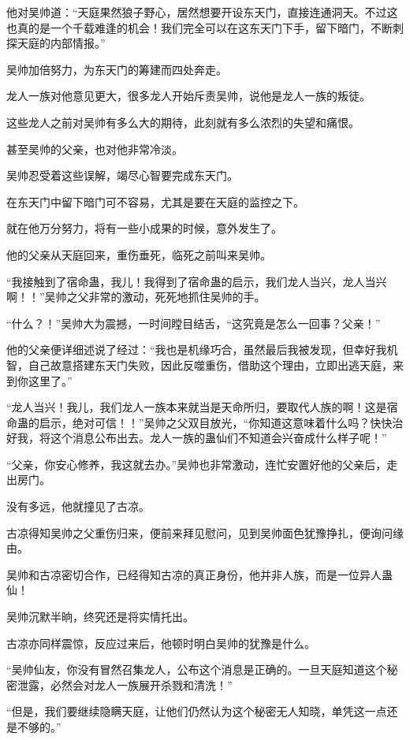 \begin{this_body}
他对吴帅道：“天庭果然狼子野心，居然想要开设东天门，直接连通洞天。不过这也真的是一个千载难逢的机会！我们完全可以在这东天门下手，留下暗门，不断刺探天庭的内部情报。”

吴帅加倍努力，为东天门的筹建而四处奔走。

龙人一族对他意见更大，很多龙人开始斥责吴帅，说他是龙人一族的叛徒。

这些龙人之前对吴帅有多么大的期待，此刻就有多么浓烈的失望和痛恨。

甚至吴帅的父亲，也对他非常冷淡。

吴帅忍受着这些误解，竭尽心智要完成东天门。

在东天门中留下暗门可不容易，尤其是要在天庭的监控之下。

就在他万分努力，将有一些小成果的时候，意外发生了。

他的父亲从天庭回来，重伤垂死，临死之前叫来吴帅。

“我接触到了宿命蛊，我儿！我得到了宿命蛊的启示，我们龙人当兴，龙人当兴啊！！”吴帅之父非常的激动，死死地抓住吴帅的手。

“什么？！”吴帅大为震撼，一时间瞠目结舌，“这究竟是怎么一回事？父亲！”

他的父亲便详细述说了经过：“我也是机缘巧合，虽然最后我被发现，但幸好我机智，自己故意搭建东天门失败，因此反噬重伤，借助这个理由，立即出逃天庭，来到你这里了。”

“龙人当兴！我儿，我们龙人一族本来就当是天命所归，要取代人族的啊！这是宿命蛊的启示，绝对可信！！”吴帅之父双目放光，“你知道这意味着什么吗？快快治好我，将这个消息公布出去。龙人一族的蛊仙们不知道会兴奋成什么样子呢！”

“父亲，你安心修养，我这就去办。”吴帅也非常激动，连忙安置好他的父亲后，走出房门。

没有多远，他就撞见了古凉。

古凉得知吴帅之父重伤归来，便前来拜见慰问，见到吴帅面色犹豫挣扎，便询问缘由。

吴帅和古凉密切合作，已经得知古凉的真正身份，他并非人族，而是一位异人蛊仙！

吴帅沉默半晌，终究还是将实情托出。

古凉亦同样震惊，反应过来后，他顿时明白吴帅的犹豫是什么。

“吴帅仙友，你没有冒然召集龙人，公布这个消息是正确的。一旦天庭知道这个秘密泄露，必然会对龙人一族展开杀戮和清洗！”

“但是，我们要继续隐瞒天庭，让他们仍然认为这个秘密无人知晓，单凭这一点还是不够的。”


\end{this_body}
